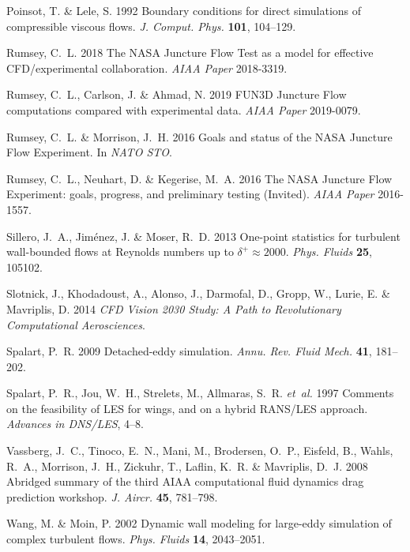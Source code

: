 \documentclass{ctr}
\begin{document}
\begin{thebibliography}{28}
{\sc Poinsot, T. \& Lele, S.} 1992 Boundary conditions for direct simulations
  of compressible viscous flows. {\em J. Comput. Phys.\/} {\bf 101}, 104--129.

{\sc Rumsey, C.~L.} 2018 {The NASA Juncture Flow Test as a model for effective
  CFD/experimental collaboration}. {\em AIAA Paper\/} 2018-3319.

{\sc Rumsey, C.~L., Carlson, J. \& Ahmad, N.} 2019 {FUN3D Juncture Flow
  computations compared with experimental data}. {\em AIAA Paper\/} 2019-0079.

{\sc Rumsey, C.~L. \& Morrison, J.~H.} 2016 Goals and status of the {NASA
  Juncture Flow Experiment}. In {\em NATO STO\/}.

{\sc Rumsey, C.~L., Neuhart, D. \& Kegerise, M.~A.} 2016 {The NASA Juncture
  Flow Experiment: goals, progress, and preliminary testing (Invited)}. {\em AIAA Paper\/} 2016-1557.

{\sc Sillero, J.~A., Jim{\'e}nez, J. \& Moser, R.~D.} 2013 One-point statistics
  for turbulent wall-bounded flows at {R}eynolds numbers up to $\delta^+\approx
  2000$. {\em Phys. Fluids\/} {\bf 25}, 105102.

{\sc Slotnick, J., Khodadoust, A., Alonso, J., Darmofal, D., Gropp, W., Lurie,
  E. \& Mavriplis, D.} 2014 {\em {CFD Vision 2030 Study: A Path to
  Revolutionary Computational Aerosciences}\/}.

{\sc Spalart, P.~R.} 2009 Detached-eddy simulation. {\em Annu. Rev. Fluid
  Mech.\/} {\bf 41}, 181--202.

{\sc Spalart, P.~R., Jou, W.~H., Strelets, M., Allmaras, S.~R. {\em et~al.\/}}
  1997 Comments on the feasibility of {LES} for wings, and on a hybrid
  {RANS/LES} approach. {\em Advances in DNS/LES\/}, 4--8.

{\sc Vassberg, J.~C., Tinoco, E.~N., Mani, M., Brodersen, O.~P., Eisfeld, B.,
  Wahls, R.~A., Morrison, J.~H., Zickuhr, T., Laflin, K.~R. \& Mavriplis,
  D.~J.} 2008 Abridged summary of the third {AIAA} computational fluid dynamics
  drag prediction workshop. {\em J. Aircr.\/} {\bf 45}, 781--798.

{\sc Wang, M. \& Moin, P.} 2002 Dynamic wall modeling for large-eddy simulation
  of complex turbulent flows. {\em Phys. Fluids\/} {\bf 14}, 2043--2051.

\end{thebibliography}

\end{document}
